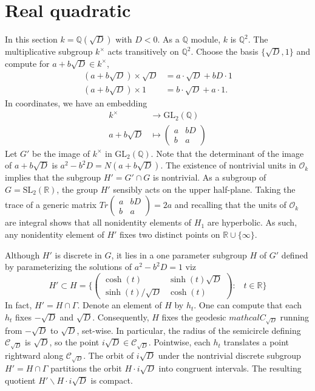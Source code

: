 \documentclass[11pt]{amsart}
\newcommand{\Q}{\mathbb{Q}}
\newcommand{\R}{\mathbb{R}}
\newcommand{\GL}{\text{GL}}
\newcommand{\SL}{\text{SL}}
\newcommand{\intring}{\mathcal{O}}
\begin{document}
\section{Real quadratic}
In this section $k=\Q(\sqrt{D})$ with $D<0$. As a $\Q$ module, $k$ is $\Q^2$. The multiplicative subgroup $k^\times$ acts transitively on $\Q^2$. Choose the basis $\{\sqrt{D},1\}$ and compute for $a+b\sqrt{D}\in k^\times$,
\begin{align*}
(a+b\sqrt{D}) \times \sqrt{D}&= a\cdot \sqrt{D} + bD \cdot 1  \\
(a+b \sqrt{D}) \times 1        &=  b \cdot \sqrt{D} + a \cdot 1 .
\end{align*}
In coordinates, we have an embedding
\begin{align*}
k^\times &\to \GL_2(\Q) \\ 
a+b\sqrt{D} &\mapsto   \begin{pmatrix}
    a & b D \\ 
    b & a     \end{pmatrix}
\end{align*}
Let $G'$ be the image of $k^\times$ in $\GL_2(\Q)$. Note that the determinant of the image of $a+b \sqrt{D}$ is $a^2-b^2 D=N(a+b\sqrt{D})$. The existence of nontrivial units in $\intring_k$ implies that the subgroup $H'=G'\cap G$ is nontrivial. As a subgroup of $G=\SL_2(\R)$, the group $H'$ sensibly acts on the upper half-plane. Taking the trace of a generic matrix  $ Tr \begin{pmatrix}
    a & b D \\ 
    b & a     \end{pmatrix}=2a$ and recalling that the units of $\intring_k$ are integral shows that all nonidentity elements of $H_1$ are hyperbolic. As such, any nonidentity element of $H'$ fixes two distinct points on $\R \cup \{ \infty \}$.

Although $H'$ is discrete in $G$, it lies in a one parameter subgroup $H$ of $G'$ defined by parameterizing the solutions of $a^2-b^2 D=1$ viz
\begin{equation*}
H'\subset H=\{ \begin{pmatrix}
    \cosh(t) & \sinh(t)\sqrt{D} \\ 
    \sinh(t)/\sqrt{D} & \cosh(t)     \end{pmatrix} : \hspace{10pt} t\in \R \}
\end{equation*}
In fact, $H'=H\cap \Gamma$. Denote an element of $H$ by $h_t$. One can compute that each $h_t$ fixes $-\sqrt{D}$ and $\sqrt{D}$. Consequently, $H$ fixes the geodesic $mathcal{C}_{\sqrt{D}}$ running from $-\sqrt{D}$ to $\sqrt{D}$, set-wise. In particular, the radius of the semicircle defining $\mathcal{C}_{\sqrt{D}}$ is $\sqrt{D}$, so the point $i\sqrt{D}\in\mathcal{C}_{\sqrt{D}}$.  Pointwise, each $h_t$ translates a point rightward along $\mathcal{C}_{\sqrt{D}}$. The orbit of $i \sqrt{D}$ under the nontrivial discrete subgroup $H'=H\cap \Gamma$ partitions the orbit $H \cdot i\sqrt{D}$ into congruent intervals. The resulting quotient $H'\backslash H \cdot i\sqrt{D}$ is compact.
\end{document}

